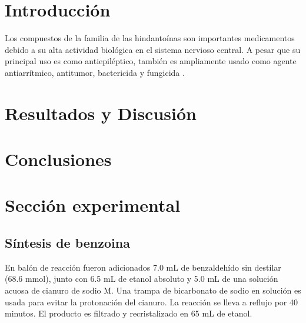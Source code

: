 \documentclass[fleqn,10pt]{SelfArx}
\begin{document}
\flushbottom %

\maketitle %


\thispagestyle{empty} %




\section*{Introducci\'on} %
Los compuestos de la familia de las hindanto\'inas son importantes medicamentos debido a su alta actividad biol\'ogica en el sistema nervioso central. A pesar que su principal uso es como antiepil\'eptico, tambi\'en es ampliamente usado como agente antiarr\'itmico, antitumor, bactericida y fungicida \cite{safari2010}. 


\section{Resultados y Discusi\'on}
\section{Conclusiones}
\section{Secci\'on experimental}
\subsection{S\'intesis de benzoina}
En bal\'on de reacci\'on fueron adicionados 7.0 mL de benzaldeh\'ido sin destilar (68.6 mmol), junto con 6.5 mL de etanol absoluto y 5.0 mL de una soluci\'on acuosa de cianuro de sodio M. Una trampa de bicarbonato de sodio en soluci\'on es usada para evitar la protonaci\'on del cianuro. La reacci\'on se lleva a reflujo por 40 minutos. El producto es filtrado y recristalizado en 65 mL de etanol.
\end{document}

